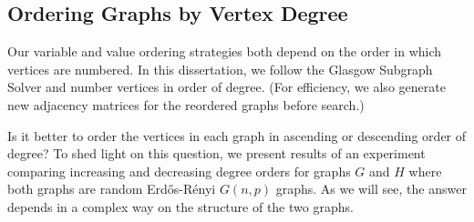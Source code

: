 \subsection{Ordering Graphs by Vertex Degree}

Our variable and value ordering strategies both depend on the order
in which vertices are numbered.
In this dissertation, we follow the Glasgow Subgraph Solver
\citep{DBLP:journals/jair/McCreeshPST18,DBLP:conf/gg/McCreeshP020}
and number vertices in order of degree. (For efficiency, we
also generate new adjacency matrices for the reordered graphs
before search.)

Is it better to order the vertices in each graph in ascending or descending
order of degree?  To shed light on this question, we present results of an
experiment comparing increasing and decreasing degree orders for graphs
$G$ and $H$ where both graphs are random Erd\H{o}s-Rényi $G(n,p)$ graphs.  As
we will see, the answer depends in a complex way on the structure of the two
graphs.

